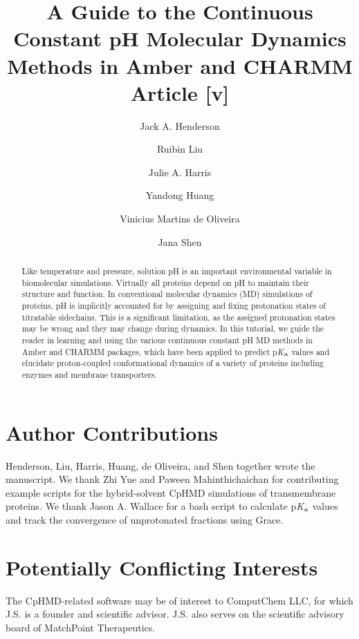 \documentclass[9pt,tutorial]{livecoms}
\title{A Guide to the Continuous Constant pH Molecular Dynamics 
Methods in Amber and CHARMM Article [v\versionnumber]}
\author[1,\authfn{1},\authfn{2}]{Jack A. Henderson}
\author[1,\authfn{1}]{Ruibin Liu}
\author[1,\authfn{3}]{Julie A. Harris}
\author[1,\authfn{4}]{Yandong Huang}
\author[1]{Vinicius Martins de Oliveira}
\author[1*]{Jana Shen}
\affil[1]{University of Maryland School of Pharmacy, Baltimore, MD}
\newcommand{\pka}{p\textit{K}$_{\rm a}$}
\begin{document}
\begin{frontmatter}
\maketitle

\begin{abstract}
Like temperature and pressure, solution pH is an important environmental variable in biomolecular simulations. 
Virtually all proteins depend on pH to maintain their structure and function. 
In conventional molecular dynamics (MD) simulations of proteins, pH is implicitly accounted for by assigning and fixing protonation states of titratable sidechains. This is a significant limitation, 
as the assigned protonation states may be wrong and they may change during dynamics.
In this tutorial, we guide the reader in learning and using the various continuous constant pH MD methods in Amber and CHARMM packages, which have been applied to predict {\pka} values and elucidate proton-coupled conformational dynamics of a variety of proteins including enzymes and membrane transporters.
\end{abstract}

\end{frontmatter}











\section{Author Contributions}
Henderson, Liu, Harris, Huang, de Oliveira, and Shen
together wrote the manuscript.
We thank Zhi Yue and Paween Mahinthichaichan for contributing example scripts for the hybrid-solvent CpHMD simulations of transmembrane proteins.
We thank Jason A. Wallace for a bash script to calculate {\pka} values and track the convergence of unprotonated fractions using Grace.

\section{Potentially Conflicting Interests}
The CpHMD-related software may be of interest to ComputChem LLC, for which
J.S. is a founder and scientific advisor.
J.S. also serves on the scientific advisory board of MatchPoint Therapeutics.
\end{document}
